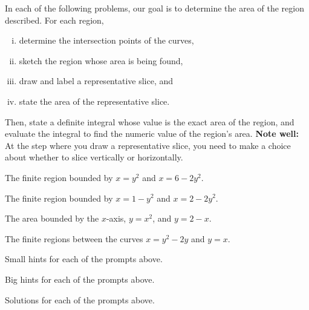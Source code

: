 \begin{activity} \label{A:4.7.3}  In each of the following problems, our goal is to determine the area of the region described.  For each region, 
\begin{enumerate}[(i),leftmargin=*]
\item determine the intersection points of the curves,
\item sketch the region whose area is being found,
\item draw and label a representative slice, and
\item state the area of the representative slice.
\end{enumerate}
Then, state a definite integral whose value is the exact area of the region, and evaluate the integral to find the numeric value of the region's area.  {\bf Note well:} At the step where you draw a representative slice, you need to make a choice about whether to slice vertically or horizontally.
\ba
	\item The finite region bounded by $x=y^2$ and $x=6-2y^2$.
	\item The finite region bounded by $x=1-y^2$ and $x = 2-2y^2$.
	\item The area bounded by the $x$-axis, $y=x^2$, and $y=2-x$.
	\item The finite regions between the curves $x=y^2-2y$ and $y=x$.

\ea

\end{activity}
\begin{smallhint}
\ba
	\item Small hints for each of the prompts above.
\ea
\end{smallhint}
\begin{bighint}
\ba
	\item Big hints for each of the prompts above.
\ea
\end{bighint}
\begin{activitySolution}
\ba
	\item Solutions for each of the prompts above.
\ea
\end{activitySolution}
\aftera